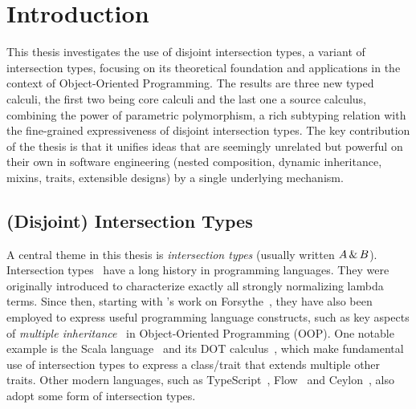 
\chapter{Introduction}




This thesis investigates the use of disjoint intersection types, a variant of
intersection types, focusing on its theoretical foundation and applications in
the context of Object-Oriented Programming. The results are three new typed
calculi, the first two being core calculi and the last one a source calculus,
combining the power of parametric polymorphism, a rich subtyping relation with
the fine-grained expressiveness of disjoint intersection types. The key
contribution of the thesis is that it unifies ideas that are seemingly unrelated
but powerful on their own in software engineering (nested composition, dynamic
inheritance, mixins, traits, extensible designs) by a single underlying
mechanism.


\section{(Disjoint) Intersection Types}


A central theme in this thesis is \textit{intersection types} (usually written $A \,\&\, B$). Intersection
types~\citep{pottinger1980type,coppo1981functional} have a long history in
programming languages. They were originally introduced to characterize exactly
all strongly normalizing lambda terms. Since then, starting with
\citeauthor{reynolds1988preliminary}'s work on
Forsythe~\citep{reynolds1988preliminary}, they have also been employed to
express useful programming language constructs, such as key aspects of
\emph{multiple inheritance}~\citep{compagnoni1996higher} in Object-Oriented
Programming (OOP). One notable example is the Scala
language~\citep{odersky2004overview} and its DOT
calculus~\citep{amin2012dependent}, which make fundamental use of intersection
types to express a class/trait that extends multiple other traits. Other modern
languages, such as TypeScript~\citep{typescript}, Flow~\citep{flow} and
Ceylon~\citep{ceylon}, also adopt some form of intersection types.

